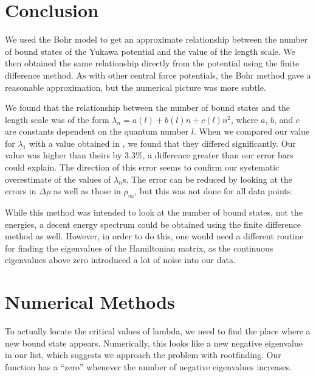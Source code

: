 \documentclass[12pt,twoside]{reedthesis}
\begin{document}

%
%
\chapter*{Conclusion}
	\setcounter{chapter}{4}
	\setcounter{section}{0}

We used the Bohr model to get an approximate relationship between the number of bound states of the Yukawa potential and the value of the length scale. We then obtained the same relationship directly from the potential using the finite difference method. As with other central force potentials, the Bohr method gave a reasonable approximation, but the numerical picture was more subtle. 

We found that the relationship between the number of bound states and the length scale was of the form $\lambda_n = a(l) + b(l)n + c(l)n^2$, where $a$, $b$, and $c$ are constants dependent on the quantum number $l$. When we compared our value for $\lambda_1$ with a value obtained in \cite{PhysRevA.50.228}, we found that they differed significantly. Our value was higher than theirs by 3.3\%, a difference greater than our error bars could explain. The direction of this error seems to confirm our systematic overestimate of the values of $\lambda_n$s. The error can be reduced by looking at the errors in $\Delta \rho$ as well as those in $\rho_{\infty}$, but this was not done for all data points.

While this method was intended to look at the number of bound states, not the energies, a decent energy spectrum could be obtained using the finite difference method as well. However, in order to do this, one would need a different routine for finding the eigenvalues of the Hamiltonian matrix, as the continuous eigenvalues above zero introduced a lot of noise into our data. 
%
\appendix
\chapter{Numerical Methods}
To actually locate the critical values of lambda, we need to find the place where a new bound state appears. Numerically, this looks like a new negative eigenvalue in our list, which suggests we approach the problem with rootfinding. Our function has a ``zero'' whenever the number of negative eigenvalues increases.
\end{document}
